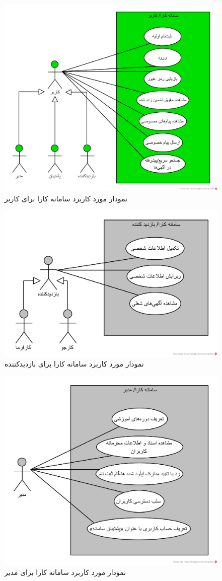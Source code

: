 \documentclass[12pt]{article}
\begin{document}
	\begin{figure}[H]
		\centering
		\includegraphics[width=0.7\linewidth]{files/UseCaseDiagram/UseCase_User}
		\caption{نمودار مورد کاربرد سامانه کارا برای کاربر}
		\label{fig:usecaseuser}
	\end{figure}
	\begin{figure}[H]
		\centering
		\includegraphics[width=0.7\linewidth]{files/UseCaseDiagram/UseCase_Visitor}
		\caption{نمودار مورد کاربرد سامانه کارا برای بازدیدکننده}
		\label{fig:usecasevisitor}
	\end{figure}
	\begin{figure}[H]
		\centering
		\includegraphics[width=0.7\linewidth]{files/UseCaseDiagram/UseCase_Admin}
		\caption{نمودار مورد کاربرد سامانه کارا برای مدیر}
		\label{fig:usecaseadmin}
	\end{figure}
\end{document}

